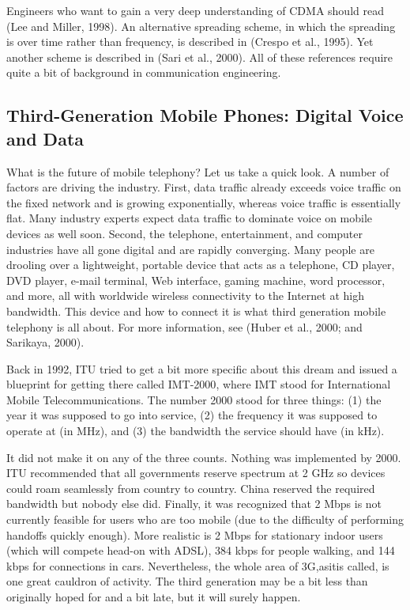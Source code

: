 Engineers who want to gain a very deep understanding of CDMA should read
(Lee and Miller, 1998). An alternative spreading scheme, in which the
spreading is over time rather than frequency, is described in (Crespo et
al., 1995). Yet another scheme is described in (Sari et al., 2000). All
of these references require quite a bit of background in communication
engineering.

\protect\hypertarget{0130661023_ch02lev1sec6.htmlux5cux23ch02lev2sec24}{}{}

\subsection{Third-Generation Mobile Phones: Digital Voice and Data}

What is the future of mobile telephony? Let us take a quick look. A
number of factors are driving the industry. First, data traffic already
exceeds voice traffic on the fixed network and is growing exponentially,
whereas voice traffic is essentially flat. Many industry experts expect
data traffic to dominate voice on mobile devices as well soon. Second,
the telephone, entertainment, and computer industries have all gone
digital and are rapidly converging. Many people are drooling over a
lightweight, portable device that acts as a telephone, CD player, DVD
player, e-mail terminal, Web interface, gaming machine, word processor,
and more, all with worldwide wireless connectivity to the Internet at
high bandwidth. This device and how to connect it is what third
generation mobile telephony is all about. For more information, see
(Huber et al., 2000; and Sarikaya, 2000).

Back in 1992, ITU tried to get a bit more specific about this dream and
issued a blueprint for getting there called {IMT-2000}, where IMT stood
for {International Mobile Telecommunications}. The number 2000 stood for
three things: (1) the year it was supposed to go into service, (2) the
frequency it was supposed to operate at (in MHz), and (3) the bandwidth
the service should have (in kHz).

It did not make it on any of the three counts. Nothing was implemented
by 2000. ITU recommended that all governments reserve spectrum at 2 GHz
so devices could roam seamlessly from country to country. China reserved
the required bandwidth but nobody else did. Finally, it was recognized
that 2 Mbps is not currently feasible for users who are {too} mobile
(due to the difficulty of performing handoffs quickly enough). More
realistic is 2 Mbps for stationary indoor users (which will compete
head-on with ADSL), 384 kbps for people walking, and 144 kbps for
connections in cars. Nevertheless, the whole area of {3G},asitis called,
is one great cauldron of activity. The third generation may be a bit
less than originally hoped for and a bit late, but it will surely
happen.

